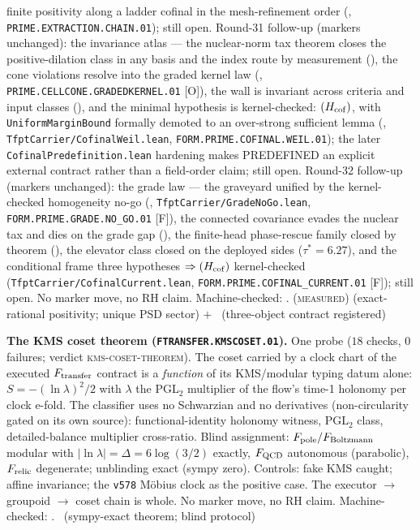 \documentclass[11pt,a4paper]{article}
\theoremstyle{definition}
\begin{document}
finite positivity along a ladder cofinal in the
mesh-refinement order
(,
\texttt{PRIME.EXTRACTION.CHAIN.01}); still open.
Round-31 follow-up (markers unchanged): the invariance atlas ---
the nuclear-norm tax theorem closes the positive-dilation class
in any basis and the index route by measurement
(), the cone violations
resolve into the graded kernel law
(,
\texttt{PRIME.CELLCONE.GRADEDKERNEL.01} [O]), the wall is
invariant across criteria and input classes
(), and the minimal hypothesis
is kernel-checked: $(H_{\rm cof})$, with
\texttt{UniformMarginBound} formally demoted to an over-strong
sufficient lemma (,
\texttt{TfptCarrier/CofinalWeil.lean},
\texttt{FORM.PRIME.COFINAL.WEIL.01}); the later
\texttt{CofinalPredefinition.lean} hardening makes PREDEFINED an
explicit external contract rather than a field-order claim; still
open.
Round-32 follow-up (markers unchanged): the grade law ---
the graveyard unified by the kernel-checked homogeneity no-go
(,
\texttt{TfptCarrier/GradeNoGo.lean},
\texttt{FORM.PRIME.GRADE.NO\_GO.01} [F]), the connected
covariance evades the nuclear tax and dies on the grade gap
(), the finite-head
phase-rescue family closed by theorem
(), the elevator class
closed on the deployed sides ($\tau^* = 6.27$), and the
conditional frame three hypotheses $\Rightarrow (H_{\rm cof})$
kernel-checked (\texttt{TfptCarrier/CofinalCurrent.lean},
\texttt{FORM.PRIME.COFINAL\_CURRENT.01} [F]); still open.  No
marker move, no RH claim.
Machine-checked: .
(\textsc{measured}) (exact-rational positivity; unique PSD sector)
$+$ \mO\ (three-object contract registered)
\par\smallskip

\par\smallskip\noindent\textbf{The KMS coset theorem
(\texttt{FTRANSFER.KMSCOSET.01}).}
One probe ($18$ checks, $0$ failures; verdict
\textsc{kms-coset-theorem}).  The coset carried by a clock chart of
the executed $F_{\rm transfer}$ contract is a \emph{function} of its
KMS/modular typing datum alone: $S=-(\ln\lambda)^2/2$ with $\lambda$
the PGL$_2$ multiplier of the flow's time-1 holonomy per clock
e-fold.  The classifier uses no Schwarzian and no derivatives
(non-circularity gated on its own source): functional-identity
holonomy witness, PGL$_2$ class, detailed-balance multiplier
cross-ratio.  Blind assignment: $F_{\rm pole}/F_{\rm Boltzmann}$
modular with $|\ln\lambda|=\Delta=6\log(3/2)$ exactly, $F_{\rm QCD}$
autonomous (parabolic), $F_{\rm relic}$ degenerate; unblinding exact
(sympy zero).  Controls: fake KMS caught; affine invariance; the
\texttt{v578} M\"obius clock as the positive case.  The
executor $\to$ groupoid $\to$ coset chain is whole.  No marker move,
no RH claim.
Machine-checked: .
\mE\ (sympy-exact theorem; blind protocol)
\par\smallskip
\end{document}
